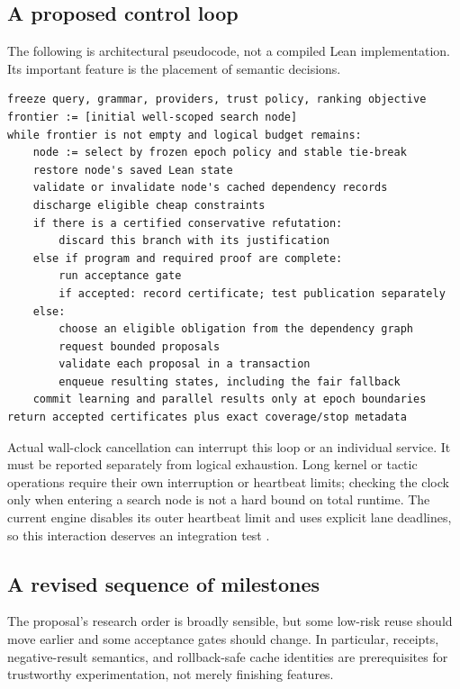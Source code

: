 \documentclass[11pt,a4paper]{article}
\theoremstyle{definition}
\theoremstyle{remark}
\begin{document}
\subsection{A proposed control loop}
The following is architectural pseudocode, not a compiled Lean implementation.
Its important feature is the placement of semantic decisions.
\begin{lstlisting}
freeze query, grammar, providers, trust policy, ranking objective
frontier := [initial well-scoped search node]
while frontier is not empty and logical budget remains:
    node := select by frozen epoch policy and stable tie-break
    restore node's saved Lean state
    validate or invalidate node's cached dependency records
    discharge eligible cheap constraints
    if there is a certified conservative refutation:
        discard this branch with its justification
    else if program and required proof are complete:
        run acceptance gate
        if accepted: record certificate; test publication separately
    else:
        choose an eligible obligation from the dependency graph
        request bounded proposals
        validate each proposal in a transaction
        enqueue resulting states, including the fair fallback
    commit learning and parallel results only at epoch boundaries
return accepted certificates plus exact coverage/stop metadata
\end{lstlisting}
Actual wall-clock cancellation can interrupt this loop or an individual service.
It must be reported separately from logical exhaustion. Long kernel or tactic
operations require their own interruption or heartbeat limits; checking the
clock only when entering a search node is not a hard bound on total runtime.
The current engine disables its outer heartbeat limit and uses explicit lane
deadlines, so this interaction deserves an integration test \cite{repo}.

\subsection{A revised sequence of milestones}
The proposal's research order is broadly sensible, but some low-risk reuse should
move earlier and some acceptance gates should change. In particular, receipts,
negative-result semantics, and rollback-safe cache identities are prerequisites
for trustworthy experimentation, not merely finishing features.
\end{document}
